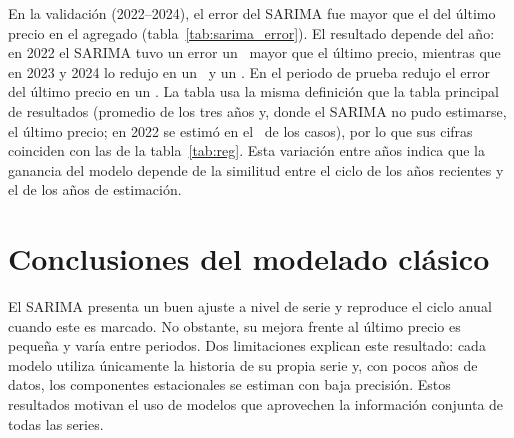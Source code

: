 

En la validación (2022--2024), el error del SARIMA fue mayor que el del último precio en el agregado (tabla~\ref{tab:sarima_error}). El resultado depende del año: en 2022 el SARIMA tuvo un error un \rvsaraabs\pct\ mayor que el último precio, mientras que en 2023 y 2024 lo redujo en un \rvsarb\pct\ y un \rvsarc\pct. En el periodo de prueba redujo el error del último precio en un \cmejsar\pct. La tabla usa la misma definición que la tabla principal de resultados (promedio de los tres años y, donde el SARIMA no pudo estimarse, el último precio; en 2022 se estimó en el \rvsardisp\pct\ de los casos), por lo que sus cifras coinciden con las de la tabla~\ref{tab:reg}. Esta variación entre años indica que la ganancia del modelo depende de la similitud entre el ciclo de los años recientes y el de los años de estimación.



\section{Conclusiones del modelado clásico}

El SARIMA presenta un buen ajuste a nivel de serie y reproduce el ciclo anual cuando este es marcado. No obstante, su mejora frente al último precio es pequeña y varía entre periodos. Dos limitaciones explican este resultado: cada modelo utiliza únicamente la historia de su propia serie y, con pocos años de datos, los componentes estacionales se estiman con baja precisión. Estos resultados motivan el uso de modelos que aprovechen la información conjunta de todas las series.

\FloatBarrier

